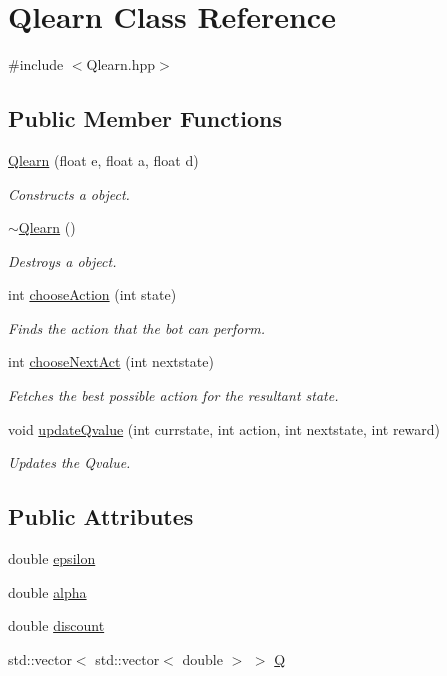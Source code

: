\hypertarget{classQlearn}{}\section{Qlearn Class Reference}
\label{classQlearn}


{\ttfamily \#include $<$Qlearn.\+hpp$>$}

\subsection*{Public Member Functions}
\begin{DoxyCompactItemize}
\item 
\hyperlink{classQlearn_aa488d216e899910cc71cfb5bf77674bc}{Qlearn} (float e, float a, float d)
\begin{DoxyCompactList}\small\item\em Constructs a object. \end{DoxyCompactList}\item 
\hyperlink{classQlearn_a8e2e2695b75f390e76b7d72faeac2a41}{$\sim$\+Qlearn} ()
\begin{DoxyCompactList}\small\item\em Destroys a object. \end{DoxyCompactList}\item 
int \hyperlink{classQlearn_a40c1b070fe8df6cebc2091362a164855}{choose\+Action} (int state)
\begin{DoxyCompactList}\small\item\em Finds the action that the bot can perform. \end{DoxyCompactList}\item 
int \hyperlink{classQlearn_ac380d33ee8246cb23e9be75acfa699a9}{choose\+Next\+Act} (int nextstate)
\begin{DoxyCompactList}\small\item\em Fetches the best possible action for the resultant state. \end{DoxyCompactList}\item 
void \hyperlink{classQlearn_a09430681d1764d3e9de028651ab2f7d7}{update\+Qvalue} (int currstate, int action, int nextstate, int reward)
\begin{DoxyCompactList}\small\item\em Updates the Qvalue. \end{DoxyCompactList}\end{DoxyCompactItemize}
\subsection*{Public Attributes}
\begin{DoxyCompactItemize}
\item 
double \hyperlink{classQlearn_a6a70fe527dd3ab0a3f4245ab5437021e}{epsilon}
\item 
double \hyperlink{classQlearn_afea088cbb6979c88aebe6a686d5cb0a7}{alpha}
\item 
double \hyperlink{classQlearn_aae7a6f1900f66914f090e81263fa9d5e}{discount}
\item 
std\+::vector$<$ std\+::vector$<$ double $>$ $>$ \hyperlink{classQlearn_aca968a8057ef5deed1436e09436f197b}{Q}
\end{DoxyCompactItemize}


